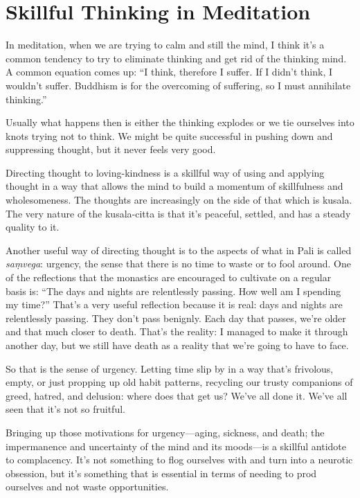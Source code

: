 \chapter{Skillful Thinking in Meditation}

In meditation, when we are trying to calm and still the mind, I think
it’s a common tendency to try to eliminate thinking and get rid of the
thinking mind. A common equation comes up: “I think, therefore I suffer.
If I didn’t think, I wouldn’t suffer. Buddhism is for the overcoming of
suffering, so I must annihilate thinking.”

Usually what happens then is either the thinking explodes or we tie
ourselves into knots trying not to think. We might be quite successful
in pushing down and suppressing thought, but it never feels very good.

Directing thought to loving-kindness is a skillful way of using and
applying thought in a way that allows the mind to build a momentum of
skillfulness and wholesomeness. The thoughts are increasingly on the
side of that which is kusala. The very nature of the kusala-citta is
that it’s peaceful, settled, and has a steady quality to it.

Another useful way of directing thought is to the aspects of what in
Pali is called \emph{saṃvega}: urgency, the sense that there is no time
to waste or to fool around. One of the reflections that the monastics
are encouraged to cultivate on a regular basis is: “The days and nights
are relentlessly passing. How well am I spending my time?” That’s a very
useful reflection because it is real: days and nights are relentlessly
passing. They don’t pass benignly. Each day that passes, we’re older and
that much closer to death. That’s the reality: I managed to make it
through another day, but we still have death as a reality that we’re
going to have to face.

So that is the sense of urgency. Letting time slip by in a way that’s
frivolous, empty, or just propping up old habit patterns, recycling our
trusty companions of greed, hatred, and delusion: where does that get
us? We’ve all done it. We’ve all seen that it’s not so fruitful.

Bringing up those motivations for urgency—aging, sickness, and death;
the impermanence and uncertainty of the mind and its moods—is a skillful
antidote to complacency. It’s not something to flog ourselves with and
turn into a neurotic obsession, but it’s something that is essential in
terms of needing to prod ourselves and not waste opportunities.


